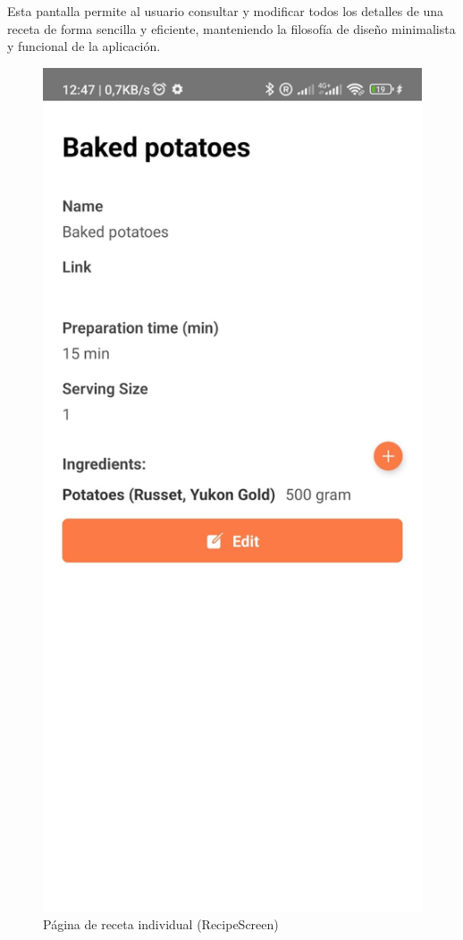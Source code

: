 \documentclass[twoside, openright, 11pt]{report}
\begin{document}
				Esta pantalla permite al usuario consultar y modificar todos los detalles de una receta de forma sencilla y eficiente, manteniendo la filosofía de diseño minimalista y funcional de la aplicación.
				
				\begin{figure}[H]
					\centering
					\includegraphics[scale=0.2]{imagenes/RecipeScreen}
					\caption{Página de receta individual (RecipeScreen)}
					\label{fig:RecipeScreen}
				\end{figure}
			
\end{document}
